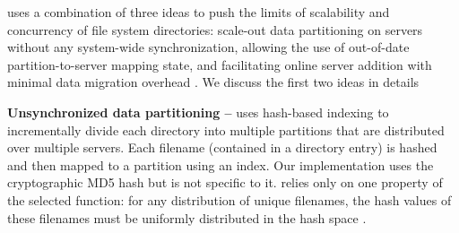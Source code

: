 \giga{} uses a combination of three ideas to push the limits of 
scalability and concurrency of file system directories: 
scale-out data partitioning on servers without any system-wide synchronization, 
allowing the use of out-of-date partition-to-server mapping state, and 
facilitating online server addition with minimal data migration overhead
\citep{giga:patil11}.
We discuss the first two ideas in details

\textbf{Unsynchronized data partitioning -- }
\giga{} uses hash-based indexing to incrementally divide each directory into
multiple partitions that are distributed over multiple servers.
Each filename (contained in a directory entry) is hashed and then mapped to a 
partition using an index. 
Our implementation uses the cryptographic MD5 hash but is not specific
to it.
\giga{} relies only on one property of the selected function: for any 
distribution of unique filenames, the hash values of these filenames must 
be uniformly distributed in the hash space \citep{md5:rfc1321}.


